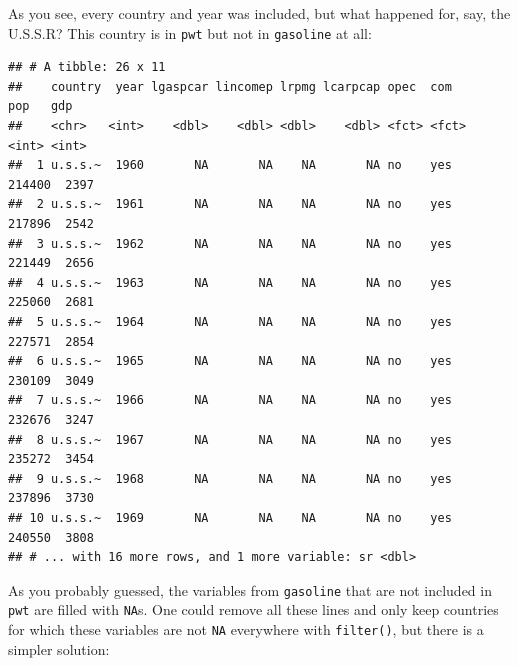\documentclass[]{gitbook}
\newenvironment{Shaded}{\begin{snugshade}}{\end{snugshade}}
\newcommand{\DataTypeTok}[1]{\textcolor[rgb]{0.13,0.29,0.53}{#1}}
\newcommand{\KeywordTok}[1]{\textcolor[rgb]{0.13,0.29,0.53}{\textbf{#1}}}
\newcommand{\NormalTok}[1]{#1}
\newcommand{\OperatorTok}[1]{\textcolor[rgb]{0.81,0.36,0.00}{\textbf{#1}}}
\newcommand{\StringTok}[1]{\textcolor[rgb]{0.31,0.60,0.02}{#1}}
\theoremstyle{definition}
\theoremstyle{definition}
\theoremstyle{definition}
\theoremstyle{remark}
\begin{document}
As you see, every country and year was included, but what happened for,
say, the U.S.S.R? This country is in \texttt{pwt} but not in
\texttt{gasoline} at all:

\begin{Shaded}
\end{Shaded}

\begin{verbatim}
## # A tibble: 26 x 11
##    country  year lgaspcar lincomep lrpmg lcarpcap opec  com      pop   gdp
##    <chr>   <int>    <dbl>    <dbl> <dbl>    <dbl> <fct> <fct>  <int> <int>
##  1 u.s.s.~  1960       NA       NA    NA       NA no    yes   214400  2397
##  2 u.s.s.~  1961       NA       NA    NA       NA no    yes   217896  2542
##  3 u.s.s.~  1962       NA       NA    NA       NA no    yes   221449  2656
##  4 u.s.s.~  1963       NA       NA    NA       NA no    yes   225060  2681
##  5 u.s.s.~  1964       NA       NA    NA       NA no    yes   227571  2854
##  6 u.s.s.~  1965       NA       NA    NA       NA no    yes   230109  3049
##  7 u.s.s.~  1966       NA       NA    NA       NA no    yes   232676  3247
##  8 u.s.s.~  1967       NA       NA    NA       NA no    yes   235272  3454
##  9 u.s.s.~  1968       NA       NA    NA       NA no    yes   237896  3730
## 10 u.s.s.~  1969       NA       NA    NA       NA no    yes   240550  3808
## # ... with 16 more rows, and 1 more variable: sr <dbl>
\end{verbatim}

As you probably guessed, the variables from \texttt{gasoline} that are
not included in \texttt{pwt} are filled with \texttt{NA}s. One could
remove all these lines and only keep countries for which these variables
are not \texttt{NA} everywhere with \texttt{filter()}, but there is a
simpler solution:

\begin{Shaded}
\end{Shaded}
\end{document}
